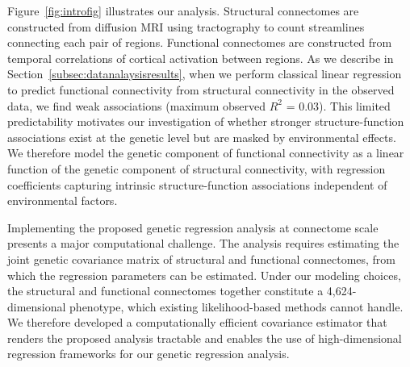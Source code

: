 \documentclass[12pt]{article}
\begin{document}
Figure~\ref{fig:introfig} illustrates our analysis. Structural connectomes are constructed from diffusion MRI using tractography to count streamlines connecting each pair of regions. Functional connectomes are constructed from temporal correlations of cortical activation between regions. As we describe in Section~\ref{subsec:datanalaysisresults}, when we perform classical linear regression to predict functional connectivity from structural connectivity in the observed data, we find weak associations (maximum observed $R^2$ = 0.03). This limited predictability motivates our investigation of whether stronger structure-function associations exist at the genetic level but are masked by environmental effects. We therefore model the genetic component of functional connectivity as a linear function of the genetic component of structural connectivity, with regression coefficients capturing intrinsic structure-function associations independent of environmental factors.


Implementing the proposed genetic regression analysis at connectome scale presents a major computational challenge. The analysis requires estimating the joint genetic covariance matrix of structural and functional connectomes, from which the regression parameters can be estimated. Under our modeling choices, the structural and functional connectomes together constitute a 4,624-dimensional phenotype, which existing likelihood-based methods cannot handle. We therefore developed a computationally efficient covariance estimator that renders the proposed analysis tractable and enables the use of high-dimensional regression frameworks for our genetic regression analysis.


\end{document}
